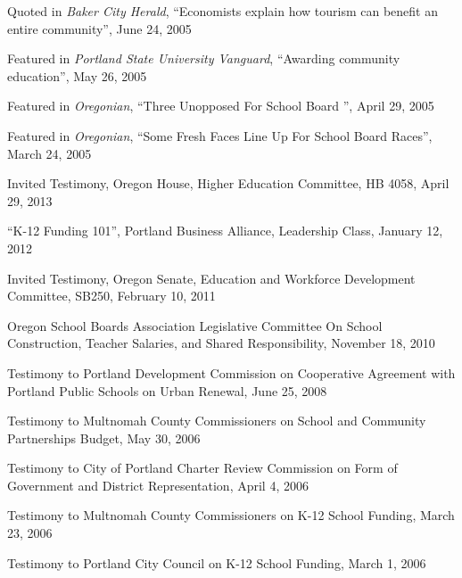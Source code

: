 \documentclass[Computer Science]{vita}
\begin{document}
\begin{vita}
\begin{Media Outreach}
  \item Quoted in \emph{Baker City Herald}, ``Economists explain how
    tourism can benefit an entire community'', June 24, 2005
	
  \item Featured in \emph{Portland State University Vanguard},
    ``Awarding community education'', May 26, 2005
	
  \item Featured in \emph{Oregonian}, ``Three Unopposed For School
    Board '', April 29, 2005
	
  \item Featured in \emph{Oregonian}, ``Some Fresh Faces Line Up For
    School Board Races'', March 24, 2005

  \end{Media Outreach}

  \begin{Community Outreach}
  
  \item Invited Testimony, Oregon House, Higher Education Committee, HB 4058, April 29, 2013

\item ``K-12 Funding 101'', Portland Business Alliance, Leadership Class, January 12, 2012

\item Invited Testimony, Oregon Senate, Education and Workforce Development Committee, SB250, February 10, 2011 
  
\item Oregon School Boards Association Legislative Committee On School Construction, Teacher Salaries, and Shared Responsibility, November 18, 2010   

  \item Testimony to Portland Development Commission on Cooperative
    Agreement with Portland Public Schools on Urban Renewal, June 25,
    2008

  \item Testimony to Multnomah County Commissioners on School and
    Community Partnerships Budget, May 30, 2006

  \item Testimony to City of Portland Charter Review Commission on
    Form of Government and District Representation, April 4, 2006

  \item Testimony to Multnomah County Commissioners on K-12 School
    Funding, March 23, 2006

  \item Testimony to Portland City Council on K-12 School Funding,
    March 1, 2006


\end{Community Outreach}
\end{vita}
\end{document}
